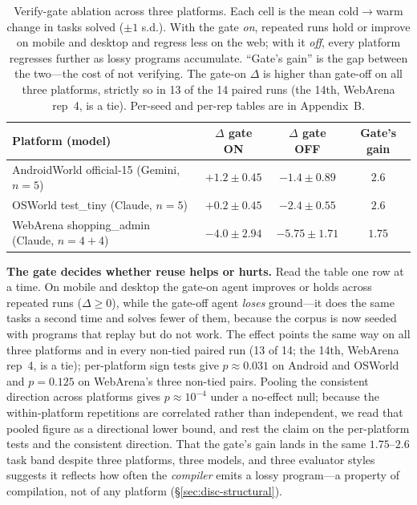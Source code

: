 \documentclass[11pt]{article}
\begin{document}
\begin{table}[t]
\centering
\caption{Verify-gate ablation across three platforms. Each cell is the mean cold$\to$warm change in tasks solved ($\pm 1$ s.d.). With the gate \emph{on}, repeated runs hold or improve on mobile and desktop and regress less on the web; with it \emph{off}, every platform regresses further as lossy programs accumulate. ``Gate's gain'' is the gap between the two---the cost of not verifying. The gate-on $\Delta$ is higher than gate-off on all three platforms, strictly so in 13 of the 14 paired runs (the 14th, WebArena rep~4, is a tie). Per-seed and per-rep tables are in Appendix~B.}
\label{tab:gate}
\small
\begin{tabular}{@{}lccc@{}}
\toprule
Platform (model) & $\Delta$ gate ON & $\Delta$ gate OFF & Gate's gain \\
\midrule
AndroidWorld official-15 (Gemini, $n{=}5$) & $+1.2 \pm 0.45$ & $-1.4 \pm 0.89$ & $2.6$ \\
OSWorld test\_tiny (Claude, $n{=}5$) & $+0.2 \pm 0.45$ & $-2.4 \pm 0.55$ & $2.6$ \\
WebArena shopping\_admin (Claude, $n{=}4{+}4$) & $-4.0 \pm 2.94$ & $-5.75 \pm 1.71$ & $1.75$ \\
\bottomrule
\end{tabular}
\end{table}

\textbf{The gate decides whether reuse helps or hurts.} Read the table one row at a time. On mobile and desktop the gate-on agent improves or holds across repeated runs ($\Delta \geq 0$), while the gate-off agent \emph{loses} ground---it does the same tasks a second time and solves fewer of them, because the corpus is now seeded with programs that replay but do not work. The effect points the same way on all three platforms and in every non-tied paired run (13 of 14; the 14th, WebArena rep~4, is a tie); per-platform sign tests give $p \approx 0.031$ on Android and OSWorld and $p = 0.125$ on WebArena's three non-tied pairs. Pooling the consistent direction across platforms gives $p \approx 10^{-4}$ under a no-effect null; because the within-platform repetitions are correlated rather than independent, we read that pooled figure as a directional lower bound, and rest the claim on the per-platform tests and the consistent direction. That the gate's gain lands in the same $1.75$--$2.6$ task band despite three platforms, three models, and three evaluator styles suggests it reflects how often the \emph{compiler} emits a lossy program---a property of compilation, not of any platform (\S\ref{sec:disc-structural}).
\end{document}
